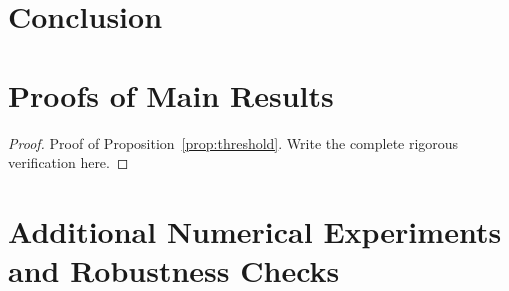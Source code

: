 \documentclass[mnsc,dblanonrev]{informs4}
\begin{document}
\section{Conclusion}
\label{sec:conclusion}







\clearpage
\ECSwitch
{}

\section{Proofs of Main Results}
\label{ec:proofs}

\begin{proof}{Proof of Proposition~\ref{prop:threshold}.}
  Write the complete rigorous verification here.
  \Halmos
\end{proof}

\section{Additional Numerical Experiments and Robustness Checks}
\label{ec:numerics}
\end{document}
